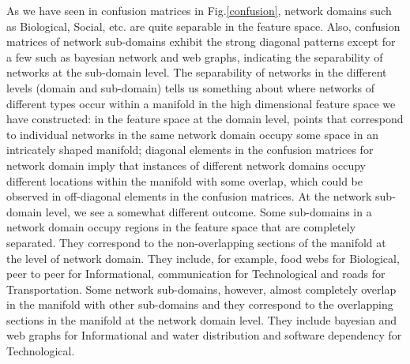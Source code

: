  As we have seen in confusion matrices in Fig.\ref{confusion}, network domains such as Biological, Social, etc. are quite separable in the feature space. Also, confusion matrices of network sub-domains exhibit the strong diagonal patterns except for a few such as bayesian network and web graphs, indicating the separability of networks at the sub-domain level. The separability of networks in the different levels (domain and sub-domain) tells us something about where networks of different types occur within a manifold in the high dimensional feature space we have constructed: in the feature space at the domain level, points that correspond to individual networks in the same network domain occupy some space in an intricately shaped manifold; diagonal elements in the confusion matrices for network domain imply that instances of different network domains occupy different locations within the manifold with some overlap, which could be observed in off-diagonal elements in the confusion matrices. At the network sub-domain level, we see a somewhat different outcome. Some sub-domains in a network domain occupy regions in the feature space that are completely separated. They correspond to the non-overlapping sections of the manifold at the level of network domain. They include, for example, food webs for Biological, peer to peer for Informational, communication for Technological and roads for Transportation. Some network sub-domains, however, almost completely overlap in the manifold with other sub-domains and they correspond to the overlapping sections in the manifold at the network domain level. They include bayesian and web graphs for Informational and water distribution and software dependency for Technological. 


